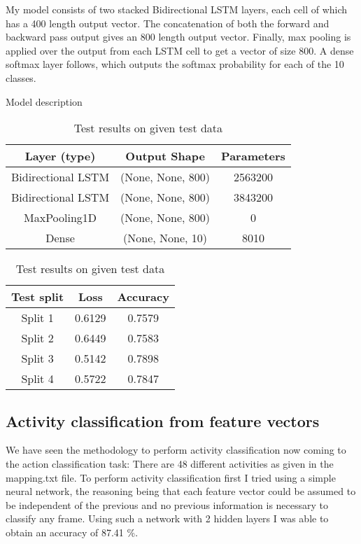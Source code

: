 \documentclass{article}
\begin{document}
My model consists of two stacked Bidirectional LSTM layers, each cell of which has a 400 length output vector. The concatenation of both the forward and backward pass output gives an 800 length output vector. Finally, max pooling is applied over the output from each LSTM cell to get a vector of size 800. A dense softmax layer follows, which outputs the softmax probability for each of the 10 classes.
\begin{table}[!htb]
    
    \begin{minipage}{.5\linewidth}
      \caption{Model description}
      \centering
        \begin{tabular}{| c | c | c |}
        \hline
        Layer (type) &  Output Shape & Parameters \\
        \hline
        \hline
        Bidirectional LSTM &  (None, None, 800) & 2563200  \\
        Bidirectional LSTM &  (None, None, 800) & 3843200  \\
        MaxPooling1D & (None, None, 800) &  0   \\
        Dense & (None, None, 10) & 8010 \\
        \hline
        \end{tabular}
    \end{minipage}%
    \begin{minipage}{.5\linewidth}
      \centering
        \caption{Test results on given test data}
         \begin{tabular}{| c | c | c |}
            \hline
         Test split & Loss & Accuracy \\ 
         \hline
         Split 1 & 0.6129 & 0.7579 \\  
         Split 2 & 0.6449 & 0.7583  \\
         Split 3 & 0.5142 & 0.7898  \\
         Split 4 & 0.5722 & 0.7847  \\
         \hline
         
        \end{tabular}
    \end{minipage} 
\end{table}
\subsection*{Activity classification from feature vectors}
We have seen the methodology to perform activity classification now coming to the action classification task:
There are 48 different activities as given in the mapping.txt file.
To perform activity classification first I tried using a simple neural network, the reasoning being that each feature vector could be assumed to be independent of the previous and no previous information is necessary to classify any frame. Using such a network with 2 hidden layers I was able to obtain an accuracy of 87.41 \%.
\end{document}

